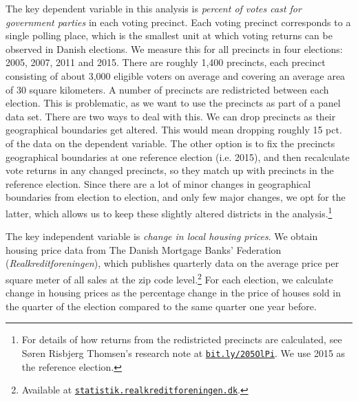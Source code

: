 \documentclass[12pt,a4paper]{article}
\begin{document}
	The key dependent variable in this analysis is \textit{percent of votes cast for government parties} in each voting precinct. Each voting precinct corresponds to a single polling place, which is the smallest unit at which voting returns can be observed in Danish elections. We measure this for all precincts in four elections:  2005, 2007, 2011 and 2015. There are roughly 1,400 precincts, each precinct consisting of about 3,000 eligible voters on average and covering an average area of 30 square kilometers. A number of precincts are redistricted between each election. This is problematic, as we want to use the precincts as part of a panel data set. There are two ways to deal with this. We can drop precincts as their geographical boundaries get altered. This would mean dropping roughly 15 pct. of the data on the dependent variable. The other option is to fix the precincts geographical boundaries at one reference election (i.e. 2015), and then recalculate vote returns in any changed precincts, so they match up with precincts in the reference election. Since there are a lot of minor changes in geographical boundaries from election to election, and only few major changes, we opt for the latter, which allows us to keep these slightly altered districts in the analysis.\footnote{For details of how returns from the redistricted precincts are calculated, see Søren Risbjerg Thomsen's research note at \texttt{\href{http://bit.ly/205OlPi}{bit.ly/205OlPi}}.  We use 2015 as the reference election.}
	
	The key independent variable is \textit{change in local housing prices}. We obtain housing price data from The Danish Mortgage Banks' Federation (\textit{Realkreditforeningen}), which publishes quarterly data on the average price per square meter of all sales at the zip code level.\footnote{Available at \texttt{\href{http://statistik.realkreditforeningen.dk/}{statistik.realkreditforeningen.dk}}.} For each election, we calculate change in housing prices as the percentage change in the price of houses sold in the quarter of the election compared to the same quarter one year before.
	
\end{document}
